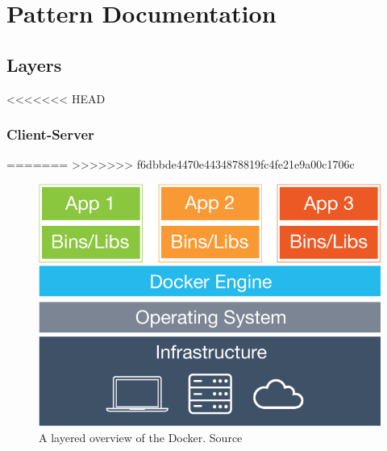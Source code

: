 
\clearpage
\chapter{Pattern Documentation}
\label{ch:patterns}


\section{Layers}

<<<<<<< HEAD

\subsection{Client-Server}

=======
>>>>>>> f6dbbde4470e4434878819fc4fe21e9a00c1706c
\begin{figure}[H]
\centering
\includegraphics[scale=0.4]{5-patterns/images/what-is-vm-diagram.png}
\caption{A layered overview of the Docker. Source \cite{whatisdocker}}
\label{fig:layers-pattern}
\end{figure}

